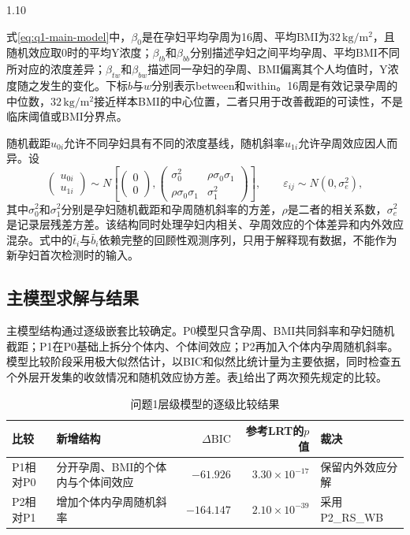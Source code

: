 \documentclass[12pt,a4paper]{ctexrep}
\numberwithin{equation}{section}
\begin{document}
\begin{spacing}{1.10}
{			式\eqref{eq:q1-main-model}中，$\beta_0$是在孕妇平均孕周为16周、平均BMI为$32\,\mathrm{kg/m^2}$，且随机效应取0时的平均Y浓度；$\beta_{tb}$和$\beta_{bb}$分别描述孕妇之间平均孕周、平均BMI不同所对应的浓度差异；$\beta_{tw}$和$\beta_{bw}$描述同一孕妇的孕周、BMI偏离其个人均值时，Y浓度随之发生的变化。下标$b$与$w$分别表示between和within。16周是有效记录孕周的中位数，$32\,\mathrm{kg/m^2}$接近样本BMI的中心位置，二者只用于改善截距的可读性，不是临床阈值或BMI分界点。

			随机截距$u_{0i}$允许不同孕妇具有不同的浓度基线，随机斜率$u_{1i}$允许孕周效应因人而异。设
			\begin{equation}
			\begin{pmatrix}u_{0i}\\u_{1i}\end{pmatrix}
			\sim N\!\left[
			\begin{pmatrix}0\\0\end{pmatrix},
			\begin{pmatrix}
			\sigma_0^2 & \rho\sigma_0\sigma_1\\
			\rho\sigma_0\sigma_1 & \sigma_1^2
			\end{pmatrix}
			\right],\qquad
			\varepsilon_{ij}\sim N(0,\sigma_e^2),
			\label{eq:q1-random-effects}
			\end{equation}
			其中$\sigma_0^2$和$\sigma_1^2$分别是孕妇随机截距和孕周随机斜率的方差，$\rho$是二者的相关系数，$\sigma_e^2$是记录层残差方差。该结构同时处理孕妇内相关、孕周效应的个体差异和内外效应混杂。式中的$\bar t_i$与$\bar b_i$依赖完整的回顾性观测序列，只用于解释现有数据，不能作为新孕妇首次检测时的输入。

			\subsection{主模型求解与结果}
			\label{subsec:q1-solution}

			主模型结构通过逐级嵌套比较确定。P0模型只含孕周、BMI共同斜率和孕妇随机截距；P1在P0基础上拆分个体内、个体间效应；P2再加入个体内孕周随机斜率。模型比较阶段采用极大似然估计，以BIC和似然比统计量为主要依据，同时检查五个外层开发集的收敛情况和随机效应协方差。表\ref{tab:q1-model-selection}给出了两次预先规定的比较。

			\begin{table}[H]
				\centering
				\caption{问题1层级模型的逐级比较结果}
				\label{tab:q1-model-selection}
				\small
				\renewcommand{\arraystretch}{1.15}
				\begin{tabularx}{\textwidth}{lXrrX}
					\toprule
					比较 & 新增结构 & $\Delta\mathrm{BIC}$ & 参考LRT的$p$值 & 裁决 \\
					\midrule
					P1相对P0 & 分开孕周、BMI的个体内与个体间效应 & $-61.926$ & $3.30\times10^{-17}$ & 保留内外效应分解 \\
					P2相对P1 & 增加个体内孕周随机斜率 & $-164.147$ & $2.10\times10^{-39}$ & 采用P2\_RS\_WB \\
					\bottomrule
				\end{tabularx}
			\end{table}

}
\end{spacing}
\end{document}
